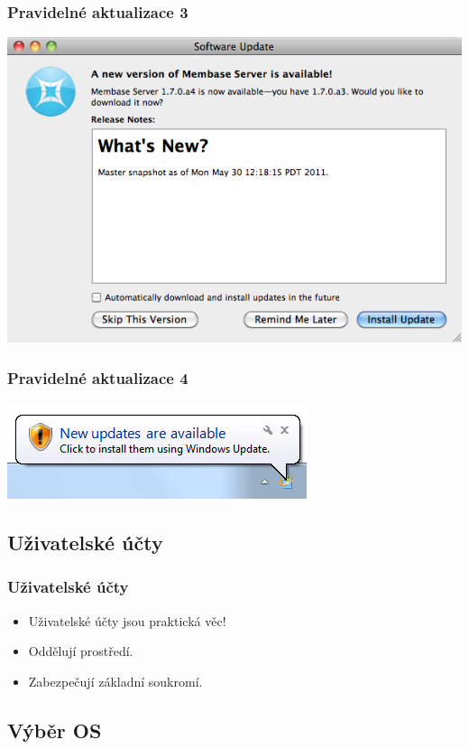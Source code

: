 \documentclass[xetex]{beamer}
\begin{document}
\begin{frame}
	\frametitle{Pravidelné aktualizace 3} 
	\includegraphics[scale=0.5]{pic/macosx-update.png}
\end{frame}

\begin{frame}
 	\frametitle{Pravidelné aktualizace 4} 
	\includegraphics{pic/win-update.png}
\end{frame}

\subsection{Uživatelské účty}

\begin{frame}
	\frametitle{Uživatelské účty} 
	\begin{itemize} 
   		\item Uživatelské účty jsou praktická věc!
	   	\item Oddělují prostředí.
   		\item Zabezpečují základní soukromí.
	\end{itemize} 
\end{frame}

\subsection{Výběr OS}
\end{document}
